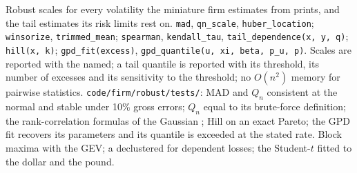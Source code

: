 \begin{build}
 Robust scales for every volatility the miniature firm estimates from prints, and the tail estimates its risk limits rest on.
 \texttt{mad}, \texttt{qn\_scale}, \texttt{huber\_location}; \texttt{winsorize}, \texttt{trimmed\_mean}; \texttt{spearman},
\texttt{kendall\_tau}, \texttt{tail\_dependence(x, y, q)}; \texttt{hill(x, k)}; \texttt{gpd\_fit(excess)}, \texttt{gpd\_quantile(u, xi, beta,
p\_u, p)}.
 Scales are reported with the  named; a tail quantile is reported with its threshold, its number of excesses and its
sensitivity to the threshold; no $O(n^2)$ memory for pairwise statistics.
 \texttt{code/firm/robust/tests/}: MAD and $Q_n$ consistent at the normal and stable under 10\% gross errors; $Q_n$ equal
to its brute-force definition; the rank-correlation formulas of the Gaussian ; Hill on an exact Pareto; the GPD fit recovers its
parameters and its quantile is exceeded at the stated rate.
 Block maxima with the GEV; a declustered  for dependent losses; the Student-$t$  fitted to the
dollar and the pound.
\end{build}

